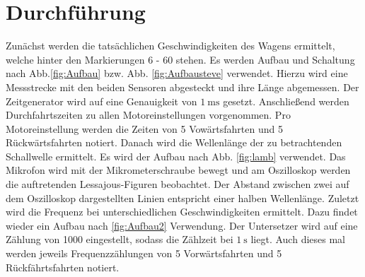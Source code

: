 
\section{Durchführung}
\label{sec:Durchführung}

\renewcommand{\labelenumi}{\alph{enumi})}
Zunächst werden die tatsächlichen Geschwindigkeiten des Wagens ermittelt, welche
 hinter den Markierungen 6 - 60 stehen. Es werden Aufbau und Schaltung nach Abb.\ref{fig:Aufbau} bzw. Abb. \ref{fig:Aufbausteve} verwendet. Hierzu wird eine Messstrecke mit den
  beiden Sensoren abgesteckt und ihre Länge abgemessen. Der Zeitgenerator wird auf eine Genauigkeit von $\SI{1}{\milli\second}$ gesetzt. Anschließend werden
   Durchfahrtszeiten zu allen Motoreinstellungen vorgenommen. Pro Motoreinstellung
    werden die Zeiten von 5 Vowärtsfahrten und 5 Rückwärtsfahrten notiert. Danach
     wird die Wellenlänge der zu betrachtenden Schallwelle ermittelt. Es wird der Aufbau nach Abb. \ref{fig:lamb} verwendet.
      Das Mikrofon wird mit der Mikrometerschraube bewegt und am Oszilloskop werden
       die auftretenden Lessajous-Figuren beobachtet. Der Abstand zwischen zwei
        auf dem Oszilloskop dargestellten Linien entspricht einer halben Wellenlänge.
         Zuletzt wird die Frequenz bei unterschiedlichen Geschwindigkeiten ermittelt.
          Dazu findet wieder ein Aufbau nach \ref{fig:Aufbau2} Verwendung. Der
          Untersetzer wird auf eine Zählung von 1000 eingestellt, sodass die Zählzeit bei $\SI{1}{\second}$ liegt.
          Auch dieses mal werden jeweils Frequenzzählungen von 5 Vorwärtsfahrten und 5 Rückfährtsfahrten notiert.

